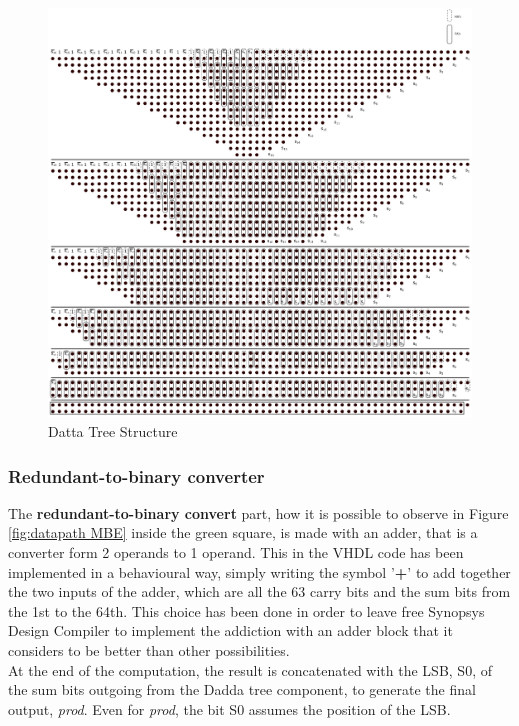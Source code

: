 \documentclass[a4paper, titlepage]{article}
\begin{document}
    
    \newpage
    \begin{figure} [htp]
\centering
\includegraphics[scale=0.17]{dadda.png}
	\caption{Datta Tree Structure }
	\label{fig:dadda}
\end{figure}
    


\subsubsection{Redundant-to-binary converter}
The \textbf{redundant-to-binary convert} part, how it is possible to observe in Figure \ref{fig:datapath MBE} inside the green square, is made with an adder,
that is a converter form 2 operands to 1 operand.
This in the VHDL code has been implemented in a behavioural way, simply writing the symbol '\textbf{+}' to add together the two inputs of the adder, which are all the 63 carry bits and the sum bits from the 1st to the 64th. This choice has been done in order to leave free Synopsys Design Compiler to implement the addiction with an adder block that it considers to be better than other possibilities.\\At the end of the computation, the result is concatenated with the LSB, S0, of the sum bits outgoing from the Dadda tree component, to generate the final output, \textit{prod}. Even for \textit{prod}, the bit S0 assumes the position of the LSB.
\newpage
\end{document}
